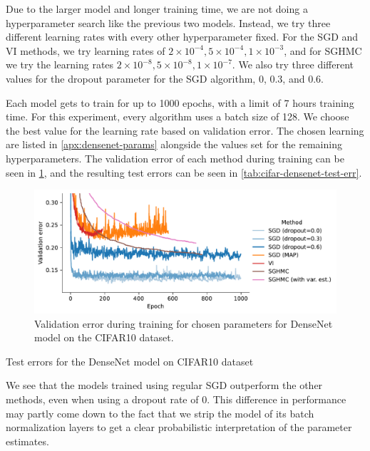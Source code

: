 Due to the larger model and longer training time, we are not doing a hyperparameter search like the previous two models.
Instead, we try three different learning rates with every other hyperparameter fixed.
For the SGD and VI methods, we try learning rates of $2\times 10^{-4},5\times 10^{-4},1\times 10^{-3}$, and for SGHMC we try the learning rates $2\times 10^{-8},5\times 10^{-8},1 \times 10^{-7}$. 
We also try three different values for the dropout parameter for the SGD algorithm, 0, 0.3, and 0.6.

Each model gets to train for up to 1000 epochs, with a limit of 7 hours training time.
For this experiment, every algorithm uses a batch size of 128.
We choose the best value for the learning rate based on validation error.
The chosen learning are listed in \cref{apx:densenet-params} alongside the values set for the remaining hyperparameters. 
The validation error of each method during training can be seen in \cref{fig:cifar-densenet-val-err}, and the resulting test errors can be seen in \cref{tab:cifar-densenet-test-err}.
\begin{figure}[htbp]
    \centering
    \includegraphics[width=\linewidth]{Figures/cifar-densenet-final-runs-val.pdf}
    \caption{Validation error during training for chosen parameters for DenseNet model on the CIFAR10 dataset.}
    \label{fig:cifar-densenet-val-err}
\end{figure}
\begin{table}[htbp]
    \centering
    
    \caption{Test errors for the DenseNet model on CIFAR10 dataset}
    \label{tab:cifar-densenet-test-err}
\end{table}
We see that the models trained using regular SGD outperform the other methods, even when using a dropout rate of 0. 
This difference in performance may partly come down to the fact that we strip the model of its batch normalization layers to get a clear probabilistic interpretation of the parameter estimates.

